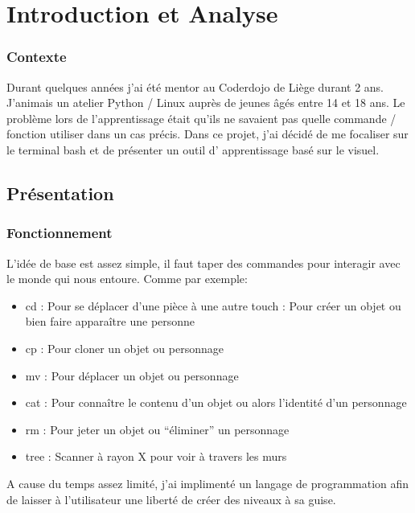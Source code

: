\documentclass{report}
\begin{document}
\part{Introduction et Analyse}

\section*{Contexte}
Durant quelques années j’ai été mentor au Coderdojo de Liège durant 2 ans. J’animais un atelier Python / Linux auprès de jeunes âgés entre 14 et 18 ans. Le problème lors de l’apprentissage était qu’ils ne savaient pas quelle commande / fonction utiliser dans un cas précis. Dans ce projet, j’ai décidé de me focaliser sur le terminal bash et de présenter un outil d’ apprentissage basé sur le visuel.
\chapter{Présentation}
\section{Fonctionnement}
L’idée de base est assez simple, il faut taper des commandes pour interagir avec le monde qui nous entoure.
\newline
\newline
Comme par exemple:

\begin {itemize}
  \item cd  : Pour se déplacer d’une pièce à une autre
  touch : Pour créer un objet ou bien faire apparaître une personne
  \item cp : Pour cloner un objet ou personnage
  \item mv : Pour déplacer un objet ou personnage
  \item cat : Pour connaître le contenu d’un objet ou alors l'identité d’un personnage
  \item rm : Pour jeter un objet ou “éliminer” un personnage
  \item tree : Scanner à rayon X pour voir à travers les murs
\end {itemize}

A cause du temps assez limité, j'ai implimenté un langage de programmation afin de laisser à l'utilisateur une liberté de créer des niveaux à sa guise.
\newpage
\end{document}
